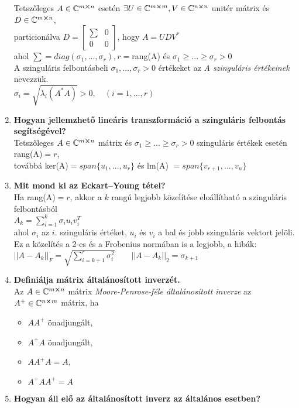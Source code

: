 \documentclass{article}
\begin{document}
\begin{enumerate}
	Tetszőleges $A\in\mathbb{C}^{m\cross n}$ esetén $\exists U\in\mathbb{C}^{m\cross m},V\in\mathbb{C}^{n\cross n}$
	unitér mátrix és $D\in\mathbb{C}^{m\cross n}$,\\[0.1cm]particionálva $D=
	\begin{bmatrix} \sum & 0 \\ 0 & 0 \end{bmatrix}$, hogy $A=UDV^*$\\[0.1cm]
	ahol $\sum=diag(\sigma_1,...,\sigma_r),r=$rang(A) és $\sigma_1\geq...\geq\sigma_r>0$
	\\[0.3cm] A szinguláris felbontásbeli $\sigma_1,...,\sigma_r>0$ értékeket az
	\textit{A szinguláris értékeinek} nevezzük.\\[0.1cm]
	{\Large $\sigma_i=\sqrt{\lambda_i(A^*A)}>0,\quad(i=1,...,r)$}
	\item\textbf{Hogyan jellemzhető lineáris transzformáció a szinguláris felbontás segítségével?}\\[0.1cm]
	Tetszőleges $A\in\mathbb{C}^{m\cross n}$ mátrix és $\sigma_1\geq...\geq\sigma_r>0$ szinguláris
	értékek esetén rang(A)$=r$,\\[0.1cm]továbbá ker(A)$=span\{u_1,...,u_r\}$ és lm(A)
	$=span\{v_{r+1},...,v_n\}$
	\newpage
	\item\textbf{Mit mond ki az Eckart–Young tétel?}\\[0.1cm]
	Ha rang(A)$=r$, akkor a $k$ rangú legjobb közelítése eloállítható a szinguláris felbontásból\\[0.1cm]
	{\Large $A_k=\sum\limits_{i=1}^{k}\sigma_iu_iv_i^T$}\\[0.1cm]
	ahol $\sigma_i$ az $i$. szinguláris értéket, $u_i$ és $v_i$ a bal és jobb szinguláris
	vektort jelöli. Ez a közelítés a 2-es és a Frobenius normában is a legjobb, a hibák:
	\\[0.1cm]{\Large $||A-A_k||_F=\sqrt{\sum\limits_{i=k+1}^{r}\sigma_i^2}\quad\quad
	||A-A_k||_2=\sigma_{k+1}$}
	\item\textbf{Definiálja mátrix általánosított inverzét.}\\[0.1cm]
	Az $A\in\mathbb{C}^{m\cross n}$ mátrix \textit{Moore-Penrose-féle általánosított
	inverze} az $A^+\in\mathbb{C}^{n\cross m}$ mátrix, ha
	\begin{itemize}
		\item $AA^+$ önadjungált,
		\item $A^+A$ önadjungált,
		\item $AA^+A=A$,
		\item $A^+AA^+=A$
	\end{itemize}
	\item\textbf{Hogyan áll elő az általánosított inverz az általános esetben?}\\[0.1cm]

\end{enumerate}
\end{document}
